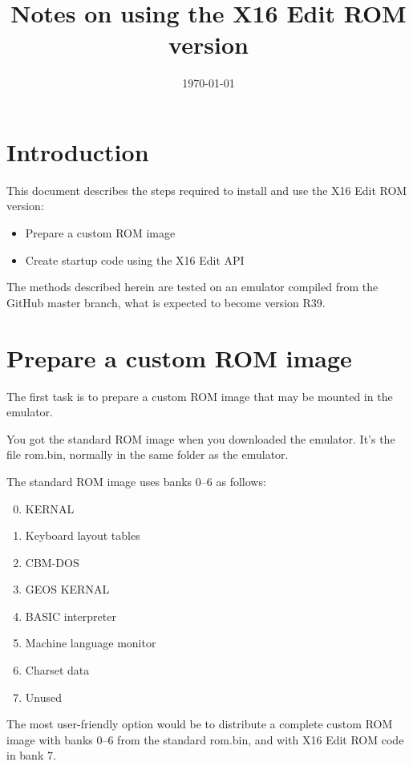 \documentclass{article}
\title{Notes on using the X16 Edit ROM version}
\date{\today}
\begin{document}
\maketitle

\section{Introduction}

    This document describes the steps required to install and use the X16 Edit ROM version:

    \begin{itemize}
        \item Prepare a custom ROM image
        \item Create startup code using the X16 Edit API
    \end{itemize}

    \noindent The methods described herein are tested on an emulator compiled from the GitHub master branch, what is expected to become version R39.

\section{Prepare a custom ROM image}

    The first task is to prepare a custom ROM image that may be mounted in the emulator.

    You got the standard ROM image when you downloaded the emulator. It's the file
    rom.bin, normally in the same folder as the emulator.

    The standard ROM image uses banks 0--6 as follows:

    \begin{enumerate}
        \setcounter{enumi}{-1}
        \item KERNAL
        \item Keyboard layout tables
        \item CBM-DOS
        \item GEOS KERNAL
        \item BASIC interpreter
        \item Machine language monitor
        \item Charset data
        \item Unused
    \end{enumerate}

    \noindent The most user-friendly option would be to distribute a complete custom ROM image with
    banks 0--6 from the standard rom.bin, and with X16 Edit ROM code in bank 7.
\end{document}

